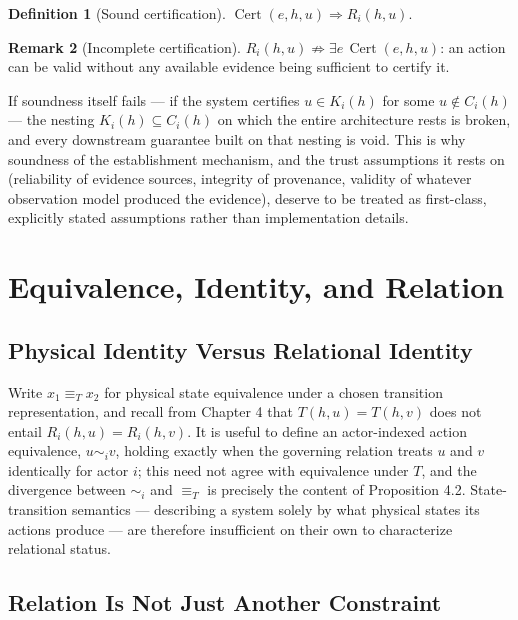 \documentclass[11pt]{report}
\theoremstyle{definition}
\newtheorem{definition}{Definition}[chapter]
\newtheorem{remark}[definition]{Remark}
\theoremstyle{plain}
\begin{document}
\begin{definition}[Sound certification]
$\operatorname{Cert}(e,h,u) \Rightarrow R_i(h,u)$.
\end{definition}

\begin{remark}[Incomplete certification]
$R_i(h,u) \not\Rightarrow \exists e\, \operatorname{Cert}(e,h,u)$: an action can be valid without any available evidence being sufficient to certify it.
\end{remark}

If soundness itself fails --- if the system certifies $u \in K_i(h)$ for some $u \notin C_i(h)$ --- the nesting $K_i(h) \subseteq C_i(h)$ on which the entire architecture rests is broken, and every downstream guarantee built on that nesting is void. This is why soundness of the establishment mechanism, and the trust assumptions it rests on (reliability of evidence sources, integrity of provenance, validity of whatever observation model produced the evidence), deserve to be treated as first-class, explicitly stated assumptions rather than implementation details.

\part{Equivalence, Identity, and Relation}

\chapter{Physical Identity Versus Relational Identity}

Write $x_1 \equiv_T x_2$ for physical state equivalence under a chosen transition representation, and recall from Chapter 4 that $T(h,u) = T(h,v)$ does not entail $R_i(h,u) = R_i(h,v)$. It is useful to define an actor-indexed action equivalence, $u \sim_i v$, holding exactly when the governing relation treats $u$ and $v$ identically for actor $i$; this need not agree with equivalence under $T$, and the divergence between $\sim_i$ and $\equiv_T$ is precisely the content of Proposition 4.2. State-transition semantics --- describing a system solely by what physical states its actions produce --- are therefore insufficient on their own to characterize relational status.

\chapter{Relation Is Not Just Another Constraint}
\end{document}
